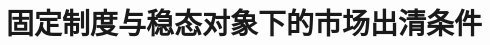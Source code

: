 \section{固定制度与稳态对象下的市场出清条件}


















































































































